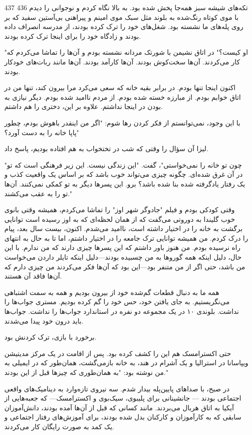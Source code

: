 437
436
تکه‌های شیشه سبز همه‌جا پخش شده بود. به بالا نگاه کردم و نوجوانی را دیدم با موی کوتاه رنگ‌شده به بلوند مثل سبک موی امینم و پیراهنی بی‌آستین سفید که بر روی پله‌های ما نشسته بود. شغل‌های خود را ترک کرده بودند، از مدرسه انصراف داده بودند و زادگاه خود را برای اینجا ترک کرده بودند.

"او کیست؟" در اتاق نشیمن با شورتک مردانه نشسته بودم و آن‌ها را تماشا می‌کردم که کار می‌کردند. آن‌ها سخت‌کوش بودند. آن‌ها کارآمد بودند. آن‌ها مانند ربات‌های خودکار بودند.

اکنون اینجا تنها بودم. در برابر بقیه خانه که سعی می‌کرد مرا بیرون کند، تنها من در اتاق خوابم بودم. از مبارزه خسته شده بودم. از مردم ناامید شده بودم. دیگر نیازی به بودن در اینجا نداشتم. علاوه بر این، دختری را هم داشتم.

با این وجود، نمی‌توانستم از فکر کردن رها شوم: "اگر من اینقدر باهوش بودم، چطور پاپا خانه را به دست آورد؟"

لیزا آن سؤال را وقتی که شب در تختخواب به هم افتاده بودیم، پاسخ داد.

"چون تو خانه را نمی‌خواستی"، گفت. "این زندگی نیست. این زیر فرهنگی است که تو در آن غرق شده‌ای. چگونه چیزی می‌تواند خوب باشد که بر اساس یک واقعیت کذب و یک رفتار یادگرفته شده بنا شده باشد؟ برو. این پسرها دیگر به تو کمکی نمی‌کنند. آن‌ها تو را به عقب می‌کشند."

وقتی کودکی بودم و فیلم "جادوگر شهر اوز" را تماشا می‌کردم، همیشه وقتی بانوی خوب گلیندا به دوروتی می‌گفت که از همان لحظه‌ای که به اوز رسیده است توانایی برگشت به خانه را در اختیار داشته است، ناامید می‌شدم. اکنون، بیست سال بعد، پیام را درک کردم. من همیشه توانایی ترک جامعه را در اختیار داشتم، اما تا به حال به انتهای راه نرسیده بودم. من هنوز باور داشتم که این پسرها چیزی دارند که من ندارم. با این حال، دلیل اینکه همه گوروها به من چسبیده بودند—دلیل اینکه تایلر داردن می‌خواست من باشد، حتی اگر از من متنفر بود—این بود که آن‌ها فکر می‌کردند من چیزی دارم که آن‌ها فاقد آن هستند.

همه ما به دنبال قطعات گم‌شده خود از بیرون بودیم و همه به سمت اشتباهی می‌نگریستیم. به جای یافتن خود، حس خود را گم کرده بودیم. مستری جواب‌ها را نداشت. بلوندی ۱۰ در یک مجموعه دو نفره در استاندارد جواب‌ها را نداشت. جواب‌ها باید درون خود پیدا می‌شدند.

برخورد با بازی، ترک کردنش بود.

حتی اکسترامسک هم این را کشف کرده بود. پس از اقامت در یک مرکز مدیتیشن ویپاسانا در استرالیا و یک آشرام در هند، به خانه بازمی‌گشت، همان‌طور که در ایمیلی به من نوشته بود: "به همان‌طوری که چیزها قبل از این بودند."

در صبح، با صداهای پایین‌پله بیدار شدم. سه نیروی تازه‌وارد به دینامیک‌های واقعی اجتماعی بودند — جانشینانی برای پلیبوی، سیک‌بوی و اکسترامسک— که جعبه‌هایی از آیکیا به اتاق هربال می‌بردند. مانند کسانی که قبل از آن‌ها آمده بودند، دانش‌آموزان سابقی که به کارآموزان و کارکنان بدل شده بودند، برای آموزش‌های رفتار اجتماعی و یک کمد به صورت رایگان کار می‌کردند.

